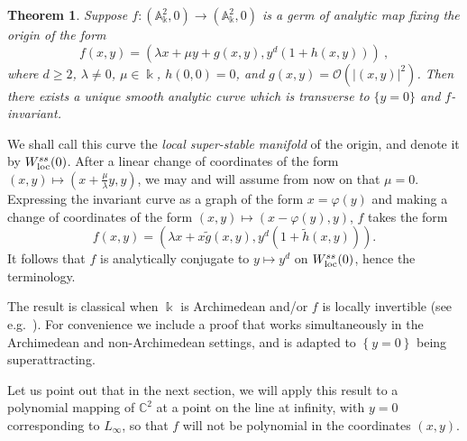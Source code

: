 \documentclass[11 pt, oneside, a4paper]{amsart}
\newcommand{\C}{\mathbb{C}}
\newcommand{\nA}{\mathbb{A}}
\newcommand{\loc}{\mathrm{loc}}
\newcommand{\set}[1]{{\left\{#1\right\}}}
\newcommand{\nk}{\Bbbk}
\newtheorem{thm}{Theorem}[section]
\theoremstyle{definition}
\theoremstyle{definition}
\begin{document}
\begin{thm}\label{thm:super-stable_manifold}
Suppose $f\colon (\nA_\nk^2, 0) \to (\nA_\nk^2,0)$ is a germ of analytic map fixing the origin of the   form
\begin{equation}\label{eq:form_f_1}
f(x,y) =  \left(\lambda x  +\mu y + g(x,y) , y^d(1+h(x,y))\right) ~,
\end{equation}
where $d\ge 2$, $\lambda\neq 0$, $\mu \in \nk$, $h(0,0)=0$, and $g(x,y) = \mathcal{O}(|(x,y)|^2)$.
Then there exists a unique smooth analytic curve which is transverse to $\{y=0\}$
and $f$-invariant.
\end{thm}

We shall call this curve the \emph{local super-stable manifold} of
the origin, and denote it by  $W^{\rm ss}_\loc(0)$. 
After a linear change of coordinates of the form $(x,y)\mapsto (x+\frac{\mu}{\lambda}y, y)$, 
we may and will assume from now on that $\mu = 0$. 
  Expressing the invariant  curve as a graph of the form 
$x=\varphi(y)$ and  making a change of coordinates of the form 
$(x,y)\mapsto (x -\varphi(y), y)$, $f$ takes the form 
\begin{equation}\label{eq:reduced_form}
f(x,y) =  (\lambda x + x\tilde g(x,y) , y^d(1+\tilde{h}(x,y))).
\end{equation}
It follows that $f$ is analytically conjugate to $y \mapsto y^d$ on  $W^{\rm ss}_\loc(0)$, hence the 
terminology.

The  result is  classical when $\nk$ is  Archimedean and/or $f$ is locally invertible
(see e.g.~\cite[Appendix]{herman-yoccoz:smalldivisornonarchi}).  
For convenience we include a proof that works  simultaneously
in the Archimedean and non-Archimedean settings, and is adapted to  $\set{y=0}$ being superattracting. 


{Let us point out that  in the next section, 
we will apply this result to a polynomial mapping of $\C^2$ at a point on the line
at infinity, with   $y=0$ corresponding  to $L_\infty$, so that  $f$ will  not be polynomial in the coordinates $(x,y)$.}
\end{document}
